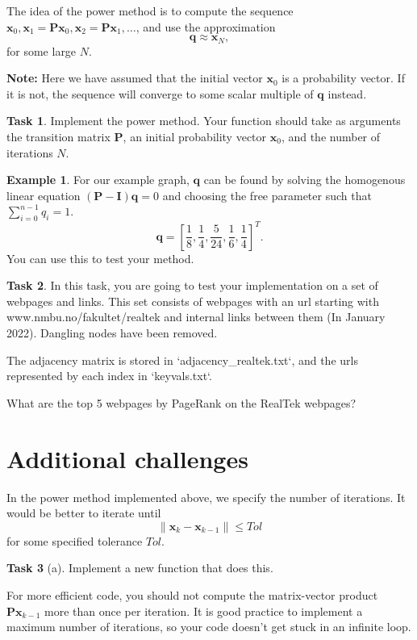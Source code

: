 \documentclass[a4paper]{scrartcl}
\theoremstyle{definition}
\newtheorem*{example}{Example}
\newtheorem{task}{Task}
\newcommand*{\mat}[1]{\mathbf{#1}}
\renewcommand*{\vec}[1]{\mathbf{#1}}
\begin{document}
The idea of the power method is to compute the sequence $\vec{x}_0, \vec{x}_1=\mat{P}\vec{x}_0, \vec{x}_2 =\mat{P}\vec{x}_1, \dotsc$, and use the approximation
\[\vec{q}\approx \vec{x}_N,
\]
for some large $N$.

\textbf{Note:} Here we have assumed that the initial vector $\vec{x}_0$ is a probability vector. If it is not, the sequence will converge to some scalar multiple of $\vec{q}$ instead. 

\begin{task}
	Implement the power method. Your function should take as arguments the transition matrix $\mat{P}$, an initial probability vector $\vec{x}_0$, and the number of iterations $N$.
\end{task}

\begin{example}
For our example graph, $\vec{q}$ can be found by solving the homogenous linear equation $\left(\mat{P}-\mat{I}\right)\vec{q}=0$ and choosing the free parameter such that $\sum_{i=0}^{n-1}q_i=1$.
\[
\vec{q} = \left[\frac{1}{8}, \frac{1}{4}, \frac{5}{24}, \frac{1}{6}, \frac{1}{4}\right]^T.
\]
You can use this to test your method.
\end{example}

\begin{task}
In this task, you are going to test your implementation on a set of webpages and links. This set consists of webpages with an url starting with www.nmbu.no/fakultet/realtek and internal links between them (In January 2022). Dangling nodes have been removed.

The adjacency matrix is stored in `adjacency\_realtek.txt`, and the urls represented by each index in `keyvals.txt`.

What are the top 5 webpages by PageRank on the RealTek webpages?
\end{task}

\section{Additional challenges}

In the power method implemented above, we specify the number of iterations. It would be better to iterate until 
$$\|\vec{x}_{k}-\vec{x}_{k-1}\|\le Tol$$
for some specified tolerance $Tol$.
\begin{task}[a] Implement a new function that does this.
\end{task}
For more efficient code, you should not compute the matrix-vector product $\mat{P}\vec{x}_{k-1}$ more than once per iteration.
It is good practice to implement a maximum number of iterations, so your code doesn't get stuck in an infinite loop.
\end{document}

